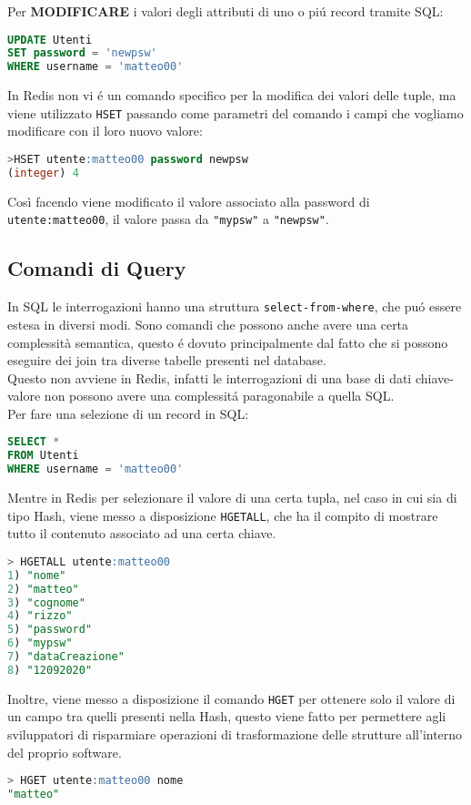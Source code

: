 Per \textbf{MODIFICARE} i valori degli attributi di uno o piú record tramite SQL:
\begin{lstlisting}[autogobble, style=redis-cli, language=SQL]
UPDATE Utenti
SET password = 'newpsw'
WHERE username = 'matteo00'\end{lstlisting}

In Redis non vi é un comando specifico per la modifica dei valori delle tuple, ma viene utilizzato \texttt{HSET} passando come parametri del comando
i campi che vogliamo modificare con il loro nuovo valore:
\begin{lstlisting}[autogobble, style=redis-cli, language=SQL]
>HSET utente:matteo00 password newpsw
(integer) 4\end{lstlisting}
Così facendo viene modificato il valore associato alla password di \texttt{utente:matteo00}, il valore passa da \texttt{"mypsw"} a \texttt{"newpsw"}.

\subsection{Comandi di Query}
In SQL le interrogazioni hanno una struttura \texttt{select-from-where}, che puó essere estesa in diversi modi. Sono comandi
che possono anche avere una certa complessità semantica, questo é dovuto principalmente dal fatto che si possono eseguire dei join
tra diverse tabelle presenti nel database.\\
Questo non avviene in Redis, infatti le interrogazioni di una base di dati chiave-valore non possono avere una complessitá paragonabile a quella SQL.\\

Per fare una selezione di un record in SQL:
\begin{lstlisting}[autogobble,style=redis-cli, language=SQL]
SELECT *
FROM Utenti
WHERE username = 'matteo00'\end{lstlisting}

Mentre in Redis per selezionare il valore di una certa tupla, nel caso in cui sia di tipo Hash, viene messo a disposizione \texttt{HGETALL}, che ha il compito di mostrare tutto
il contenuto associato ad una certa chiave.
\begin{lstlisting}[autogobble, style=redis-cli, language=SQL]
> HGETALL utente:matteo00
1) "nome"
2) "matteo"
3) "cognome"
4) "rizzo"
5) "password"
6) "mypsw"
7) "dataCreazione"
8) "12092020"
\end{lstlisting}

Inoltre, viene messo a disposizione il comando \texttt{HGET} per ottenere solo il valore di un campo tra quelli presenti nella Hash, questo viene fatto per permettere
agli sviluppatori di risparmiare operazioni di trasformazione delle strutture all'interno del proprio software.
\begin{lstlisting}[autogobble, style=redis-cli, language=SQL]
> HGET utente:matteo00 nome
"matteo"
\end{lstlisting}

